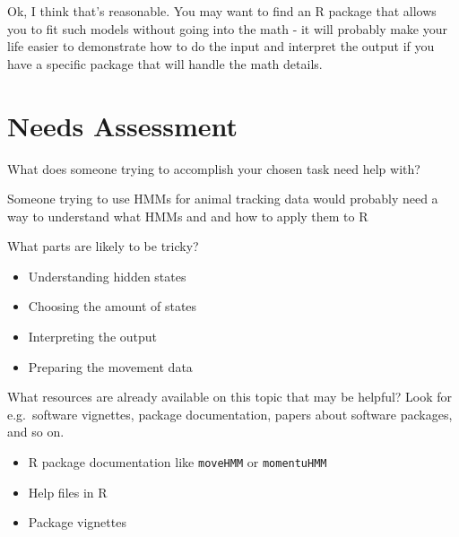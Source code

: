 \documentclass[
  letterpaper,
  DIV=11,
  numbers=noendperiod]{scrreprt}
\providecommand{\tightlist}{%
  \setlength{\itemsep}{0pt}\setlength{\parskip}{0pt}}
\begin{document}
\begin{tcolorbox}[enhanced jigsaw, colback=white, colbacktitle=quarto-callout-note-color!10!white, coltitle=black, opacitybacktitle=0.6, bottomrule=.15mm, colframe=quarto-callout-note-color-frame, toptitle=1mm, leftrule=.75mm, opacityback=0, bottomtitle=1mm, toprule=.15mm, rightrule=.15mm, titlerule=0mm, breakable, left=2mm, arc=.35mm, title=\textcolor{quarto-callout-note-color}{\faInfo}\hspace{0.5em}{Comments/suggestions}]

Ok, I think that's reasonable. You may want to find an R package that
allows you to fit such models without going into the math - it will
probably make your life easier to demonstrate how to do the input and
interpret the output if you have a specific package that will handle the
math details.

\end{tcolorbox}

\chapter{Needs Assessment}\label{needs-assessment}

What does someone trying to accomplish your chosen task need help with?

Someone trying to use HMMs for animal tracking data would probably need
a way to understand what HMMs and and how to apply them to R

What parts are likely to be tricky?

\begin{itemize}
\tightlist
\item
  Understanding hidden states
\item
  Choosing the amount of states
\item
  Interpreting the output
\item
  Preparing the movement data
\end{itemize}

What resources are already available on this topic that may be helpful?
Look for e.g.~software vignettes, package documentation, papers about
software packages, and so on.

\begin{itemize}
\tightlist
\item
  R package documentation like \texttt{moveHMM} or \texttt{momentuHMM}
\item
  Help files in R
\item
  Package vignettes
\end{itemize}
\end{document}
